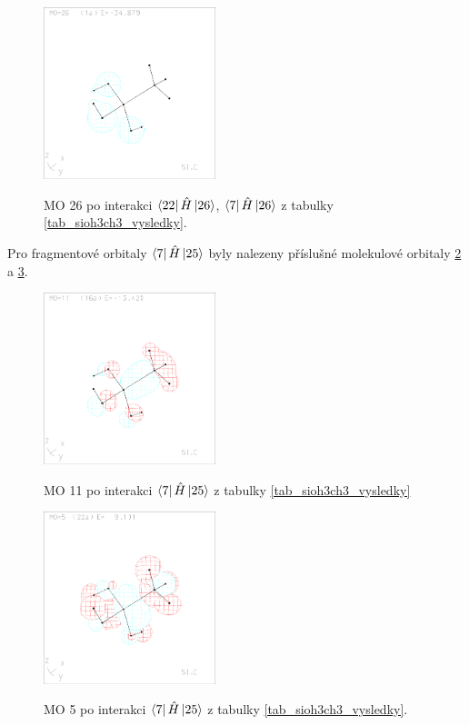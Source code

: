 \documentclass[
  digital, %
  table,   %
  lof,     %
  lot,     %
]{fithesis3}
\begin{document}
\begin{figure}[h]
\caption{MO 26 po interakci $\bra{22}{\hat{H}}\ket{26}$, $\bra{7}{\hat{H}}\ket{26}$ z tabulky \ref{tab_sioh3ch3_vysledky}.  }
  \center
  \includegraphics[width=5cm]{sioh3ch3_obrazky/s1_26.eps}
  \label{obr_sioh3ch3_MO_s1_26}
  \end{figure}
  
Pro fragmentové orbitaly $\bra{7}{\hat{H}}\ket{25}$ byly nalezeny příslušné molekulové orbitaly \ref{obr_sioh3ch3_MO_s2_11} a \ref{obr_sioh3ch3_MO_s2_5}.
  
  \begin{figure}[h]
\caption{MO 11 po interakci $\bra{7}{\hat{H}}\ket{25}$ z tabulky \ref{tab_sioh3ch3_vysledky}}
  \center
  \includegraphics[width=5cm]{sioh3ch3_obrazky/s2_11.eps}
  \label{obr_sioh3ch3_MO_s2_11}
  \end{figure}

\begin{figure}[h]
\caption{MO 5 po interakci $\bra{7}{\hat{H}}\ket{25}$ z tabulky \ref{tab_sioh3ch3_vysledky}.  }
  \center
  \includegraphics[width=5cm]{sioh3ch3_obrazky/s2_5.eps}
  \label{obr_sioh3ch3_MO_s2_5}
  \end{figure}
\end{document}
